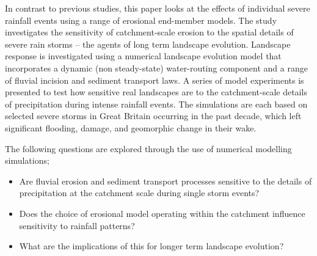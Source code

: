 
In contrast to previous studies, this paper looks at the effects of individual severe rainfall events using a range of erosional end-member models. The study investigates the sensitivity of catchment-scale erosion to the spatial details of severe rain storms -- the agents of long term landscape evolution. Landscape response is investigated using a numerical landscape evolution model that incorporates a dynamic (non steady-state) water-routing component and a range of fluvial incision and sediment transport laws. A series of model experiments is presented to test how sensitive real landscapes are to the catchment-scale details of precipitation during intense rainfall events. The simulations are each based on selected severe storms in Great Britain occurring in the past decade, which left significant flooding, damage, and geomorphic change in their wake.

The following questions are explored through the use of numerical modelling simulations;

\begin{itemize}
\item Are fluvial erosion and sediment transport processes sensitive to the details of precipitation at the catchment scale during single storm events?
\item Does the choice of erosional model operating within the catchment influence sensitivity to rainfall patterns? 
\item What are the implications of this for longer term landscape evolution? 
\end{itemize}

